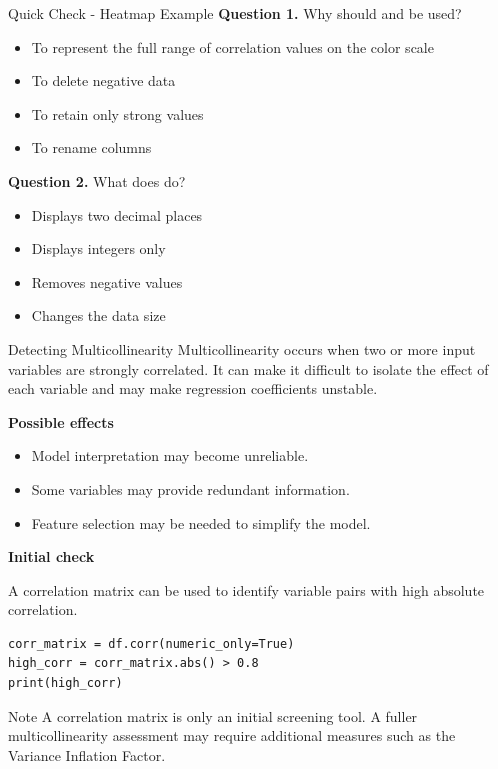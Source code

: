 \documentclass[aspectratio=169,11pt]{beamer}
\begin{document}
\begin{frame}[allowframebreaks]{Quick Check - Heatmap Example}
\footnotesize
\textbf{Question 1.} Why should \texttt{} and \texttt{} be used?\par\medskip
\begin{itemize}
\item[\textbf{A.}] To represent the full range of correlation values on the color scale
\item[\textbf{B.}] To delete negative data
\item[\textbf{C.}] To retain only strong values
\item[\textbf{D.}] To rename columns
\end{itemize}
\textbf{Question 2.} What does \texttt{} do?\par\medskip
\begin{itemize}
\item[\textbf{A.}] Displays two decimal places
\item[\textbf{B.}] Displays integers only
\item[\textbf{C.}] Removes negative values
\item[\textbf{D.}] Changes the data size
\end{itemize}
\end{frame}

\begin{frame}{Detecting Multicollinearity}
\small
Multicollinearity occurs when two or more input variables are strongly correlated. It can make it difficult to isolate the effect of each variable and may make regression coefficients unstable.\par\medskip
\textbf{Possible effects}\par\medskip
\begin{itemize}
\item Model interpretation may become unreliable.
\item Some variables may provide redundant information.
\item Feature selection may be needed to simplify the model.
\end{itemize}
\textbf{Initial check}\par\medskip
A correlation matrix can be used to identify variable pairs with high absolute correlation.\par\medskip
\begin{lstlisting}[style=py]
corr_matrix = df.corr(numeric_only=True)
high_corr = corr_matrix.abs() > 0.8
print(high_corr)
\end{lstlisting}
\begin{block}{Note}
A correlation matrix is only an initial screening tool. A fuller multicollinearity assessment may require additional measures such as the Variance Inflation Factor.
\end{block}
\end{frame}
\end{document}
